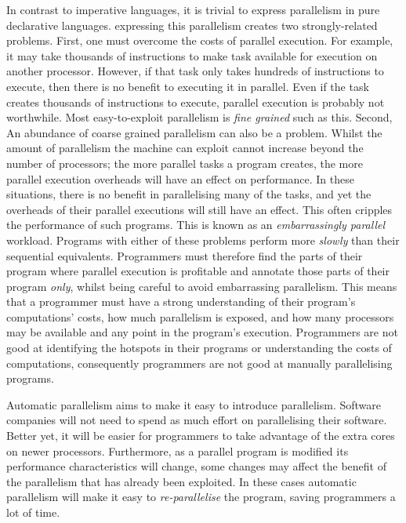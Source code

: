 In contrast to imperative languages,
it is trivial to express parallelism in pure declarative languages.
expressing this parallelism creates two strongly-related problems.
First,
one must overcome the costs of parallel execution.
For example,
it may take thousands of instructions to make task available for execution on
another processor.
However, if that task only takes hundreds of instructions to execute,
then there is no benefit to executing it in parallel.
Even if the task creates thousands of instructions to execute,
parallel execution is probably not worthwhile.
Most easy-to-exploit parallelism is \emph{fine grained} such as this.
Second,
An abundance of coarse grained parallelism can also be a problem.
Whilst the amount of parallelism the machine can exploit
cannot increase beyond the number of processors;
the more parallel tasks a program creates,
the more parallel execution overheads will have an effect on performance.
In these situations,
there is no benefit in parallelising many of the tasks,
and yet the overheads of their parallel executions will still have an
effect.
This often cripples the performance of such programs.
This is known as an \emph{embarrassingly parallel} workload.
Programs with either of these problems perform more \emph{slowly} than their
sequential equivalents.
Programmers must therefore find the parts of their program where parallel execution
is profitable and annotate those parts of their program \emph{only},
whilst being careful to avoid embarrassing parallelism.
This means that a programmer must have a strong understanding of their
program's  computations' costs,
how much parallelism is exposed,
and how many processors may be available and any point in the program's
execution.
Programmers are not good at identifying the hotspots in their programs
or understanding the costs of computations,
consequently programmers are not good at manually parallelising programs.

Automatic parallelism aims to make it easy to introduce parallelism.
Software companies will not need to spend as much effort on parallelising
their software.
Better yet,
it will be easier for programmers to take advantage of the extra cores on
newer processors.
Furthermore, 
as a parallel program is modified its performance characteristics will
change,
some changes may affect the benefit of the parallelism that has already been
exploited.
In these cases automatic parallelism will make it easy to
\emph{re-parallelise} the program,
saving programmers a lot of time.

